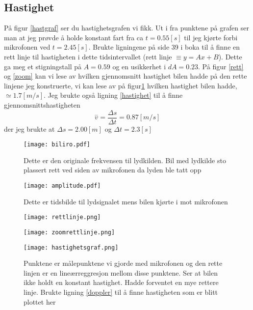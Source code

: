 \documentclass[norsk,a4paper,12pt]{article}
\begin{document}
\subsection{Hastighet}

På figur \vref{hastgraf} ser du hastighetsgrafen vi fikk. Ut i fra punktene på grafen ser man at jeg prøvde å holde konstant fart fra ca $t= 0.55 [s]$ til jeg kjørte forbi mikrofonen ved $t=2.45[s]$.
Brukte ligningene på side 39 i boka \cite{squires} til å finne en rett linje til hastigheten i dette tidsintervallet (rett linje $\equiv y = Ax+B$). Dette ga meg et stigningstall på $A=0.59$ og en usikkerhet i $dA=0.23$. På figur \ref{rett} og \vref{zoom} kan vi lese av hvilken gjennomsnitt hastighet bilen hadde på den rette linjene jeg konstruerte, vi kan lese av på figur\ref{zoom} hvilken hastighet bilen hadde, $\simeq 1.7 [m/s]$. 
Jeg brukte også ligning \vref{hastighet} til å finne gjennomsnittshastigheten
$$
\overset{-}{v} = \frac{\Delta s}{\Delta t}= 0.87[m/s] 
$$
der jeg brukte at $\Delta s = 2.00[m]$ og $\Delta t = 2.3[s]$

\begin{figure}
	\begin{minipage}{.5\linewidth}
	\centering
	\texttt{[image: biliro.pdf]}
	\caption[Frekvensen til lydkilden]{Dette er den originale frekvensen til lydkilden. Bil med lydkilde 	sto plassert rett ved siden av mikrofonen da lyden ble tatt opp}
	\end{minipage}
	\hspace{.5cm}
	\begin{minipage}{.5\linewidth}
	\centering
	\texttt{[image: amplitude.pdf]}
	\caption[Tidsbilde av lydsignalet]{Dette er tidsbilde til lydsignalet mens bilen kjørte i mot
	mikrofonen}
	\end{minipage}
	\hspace{0.5cm}
	\begin{minipage}{.5\linewidth}
	\centering
	\texttt{[image: rettlinje.png]}
	\caption[Rett linje basert på hastigheten]{}
	\label{rett}
	\end{minipage}
	\hspace{.5cm}
	\begin{minipage}{.5\linewidth}
	\centering
	\texttt{[image: zoomrettlinje.png]}
	\caption[Zoom av rett linje]{}
	\label{zoom}
	\end{minipage}
\end{figure}


\begin{figure}
\centering
\texttt{[image: hastighetsgraf.png]}
\caption[Hastighetsgraf]{Punktene er målepunktene vi gjorde med mikrofonen og den rette linjen er en lineærreggresjon mellom disse punktene. Ser at bilen ikke holdt en konstant hastighet. Hadde forventet en mye rettere linje. Brukte ligning \vref{doppler} til å finne hastigheten som er blitt plottet her}
\label{hastgraf}
\end{figure}
\end{document}
